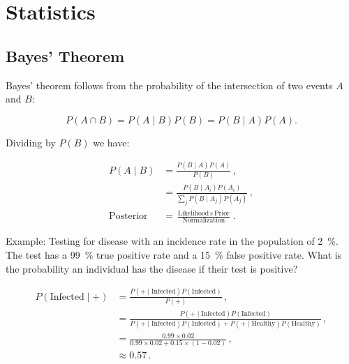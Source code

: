 \chapter{Statistics}
\label{chap:stats}

\section{Bayes' Theorem}
\label{stats:Bayes}

Bayes' theorem follows from the probability of the intersection of two events $A$ and $B$:

\begin{equation}\label{eq:stats:intersection}
P\left(A \cap B\right) = P\left(A \mid B\right) P\left(B\right) = P\left(B \mid A\right) P\left(A\right).
\end{equation}

\noindent Dividing by $P\left(B\right)$ we have:

\begin{equation}\label{eq:stats:Bayes}
\begin{split}
P\left(A \mid B\right) &= \frac{P\left(B \mid A\right) P\left(A\right)}{P\left(B\right)}\,, \\
&= \frac{P\left(B \mid A_{i}\right) P\left(A_{i}\right)}{\sum_{j} P\left(B \mid A_{j}\right)P\left(A_{j}\right)}\,, \\
\text{Posterior} &= \frac{\text{Likelihood} \times \text{Prior}}{\text{Normalization}}\,.
\end{split}
\end{equation}

Example: Testing for disease with an incidence rate in the population of \SI{2}{\percent}.
The test has a \SI{99}{\percent} true positive rate and a \SI{15}{\percent} false positive rate.
What is the probability an individual has the disease if their test is positive?

\begin{equation}\label{eq:stats:BayesEx}
\begin{split}
P\left(\text{Infected} \mid +\right) &= \frac{P\left(+ \mid \text{Infected}\right) P\left(\text{Infected}\right)}{P\left(+\right)}\,, \\
 &= \frac{P\left(+ \mid \text{Infected}\right) P\left(\text{Infected}\right)}{
P\left(+ \mid \text{Infected}\right)P\left(\text{Infected}\right) + P\left(+ \mid \text{Healthy}\right)P\left(\text{Healthy}\right)}\,, \\
&= \frac{\num{0.99} \times \num{0.02}}{\num{0.99} \times \num{0.02} + \num{0.15} \times \left(1-\num{0.02}\right)}\,, \\
&\approx \num{0.57}\,.
\end{split}
\end{equation}

